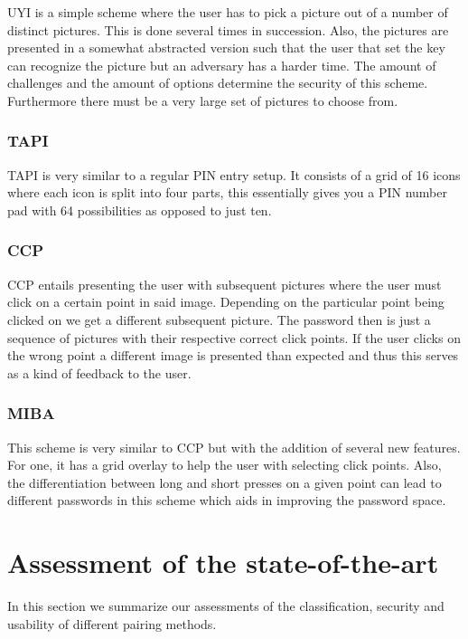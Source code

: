 \documentclass[conference, 11pt]{sty/IEEEtran}
\begin{document}
UYI is a simple scheme where the user has to pick a picture out of a number of distinct pictures.
This is done several times in succession.
Also, the pictures are presented in a somewhat abstracted version such that the user that set the key can recognize the picture but an adversary has a harder time.
The amount of challenges and the amount of options determine the security of this scheme.
Furthermore there must be a very large set of pictures to choose from.

\subsubsection{TAPI}
\label{sssec:tapi}

TAPI is very similar to a regular PIN entry setup.
It consists of a grid of 16 icons where each icon is split into four parts, this essentially gives you a PIN number pad with 64 possibilities as opposed to just ten.

\subsubsection{CCP}
\label{sssec:ccp}

CCP entails presenting the user with subsequent pictures where the user must click on a certain point in said image.
Depending on the particular point being clicked on we get a different subsequent picture.
The password then is just a sequence of pictures with their respective correct click points.
If the user clicks on the wrong point a different image is presented than expected and thus this serves as a kind of feedback to the user.

\subsubsection{MIBA}
\label{sssec:miba}

This scheme is very similar to CCP but with the addition of several new features.
For one, it has a grid overlay to help the user with selecting click points.
Also, the differentiation between long and short presses on a given point can lead to different passwords in this scheme which aids in improving the password space.

\section{Assessment of the state-of-the-art}
\label{sec:assessment_of_the_state_of_the_art}
In this section we summarize our assessments of the classification, security and usability of different pairing methods.
\end{document}

